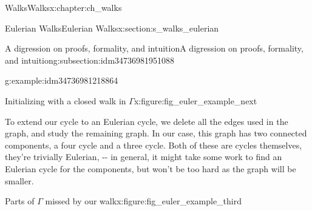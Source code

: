 \documentclass[oneside,10pt,]{book}
\numberwithin{equation}{section}
\begin{document}
\begin{chapterptx}{Walks}{}{Walks}{}{}{x:chapter:ch_walks}
\begin{sectionptx}{Eulerian Walks}{}{Eulerian Walks}{}{}{x:section:s_walks_eulerian}
\begin{subsectionptx}{A digression on proofs, formality, and intuition}{}{A digression on proofs, formality, and intuition}{}{}{g:subsection:idm34736981951088}
\begin{example}{}{g:example:idm34736981218864}
\begin{figureptx}{Initializing with a closed walk in \(\Gamma\)}{x:figure:fig_euler_example_next}{}
\begin{image}{0.15}{0.7}{0.15}
{
}%
\end{image}%
\tcblower
\end{figureptx}%
To extend our cycle to an Eulerian cycle, we delete all the edges used in the graph, and study the remaining graph.  In our case, this graph has two connected components, a four cycle and a three cycle.  Both of these are cycles themselves, they're trivially Eulerian, -{}-{} in general, it might take some work to find an Eulerian cycle for the components, but won't be too hard as the graph will be smaller.%
\begin{figureptx}{Parts of \(\Gamma\) missed by our walk}{x:figure:fig_euler_example_third}{}%
\begin{image}{0.15}{0.7}{0.15}%
\end{image}
\end{figureptx}
\end{example}
\end{subsectionptx}
\end{sectionptx}
\end{chapterptx}
\end{document}
